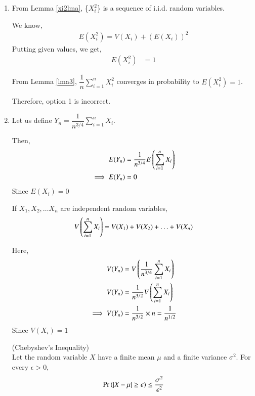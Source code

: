 \documentclass[journal,12pt,twocolumn]{IEEEtran}
\begin{document}
\begin{enumerate}
\item 
From Lemma \ref{xi2lma}, \{$X_i^2$\} is a sequence of i.i.d. random variables.

We know,
\begin{align}
    E(X_i^2)=V(X_i)+(E(X_i))^2
\end{align}
Putting given values, we get,
\begin{align} 
    E(X_i^2)&=1 \label{muval}
\end{align}

From Lemma \ref{lma3},  
\begin{math}\dfrac{1}{n}\sum_{i=1}^n X_i^2\end{math} converges in probability to $E(X_i^2)=1$.

Therefore, option 1 is incorrect.

\item Let us define
\begin{math}
    Y_n=\dfrac{1}{n^{3/4}}\sum_{i=1}^n X_i.
\end{math}

Then,
\begin{align}
    E(Y_n) &= \dfrac{1}{n^{3/4}}E\left(\sum_{i=1}^n X_i\right) \\
    \implies E(Y_n) &= 0
\end{align}
Since $E(X_i) = 0$


\begin{lemma}
    If $X_1, X_2, \ldots X_n$ are independent random variables,
    \begin{align}
        V\left(\sum_{i=1}^n X_i\right) = V(X_1)+V(X_2)+\ldots +V(X_n)
    \end{align}
\end{lemma}

Here, 
\begin{align}
    V(Y_n) &= V\left(\dfrac{1}{n^{3/4}}\sum_{i=1}^n X_i\right) \\
    V(Y_n) &= \dfrac{1}{n^{3/2}} V\left(\sum_{i=1}^n X_i\right)\\
    \implies V(Y_n) &= \dfrac{1}{n^{3/2}} \times n = \dfrac{1}{n^{1/2}}
\end{align}
Since $V(X_i) = 1$

\begin{lemma}\label{lma4}
    (Chebyshev's Inequality)\\
Let the random variable $X$ have a finite mean $\mu$ and a finite variance $\sigma^2$. For every $\epsilon>0$, 
\begin{align}
    \Pr\left(\vert X - \mu\vert \geq \epsilon\right) \leq \frac{\sigma^2}{\epsilon^2}
\end{align}
\end{lemma}


\end{enumerate}
\end{document}
